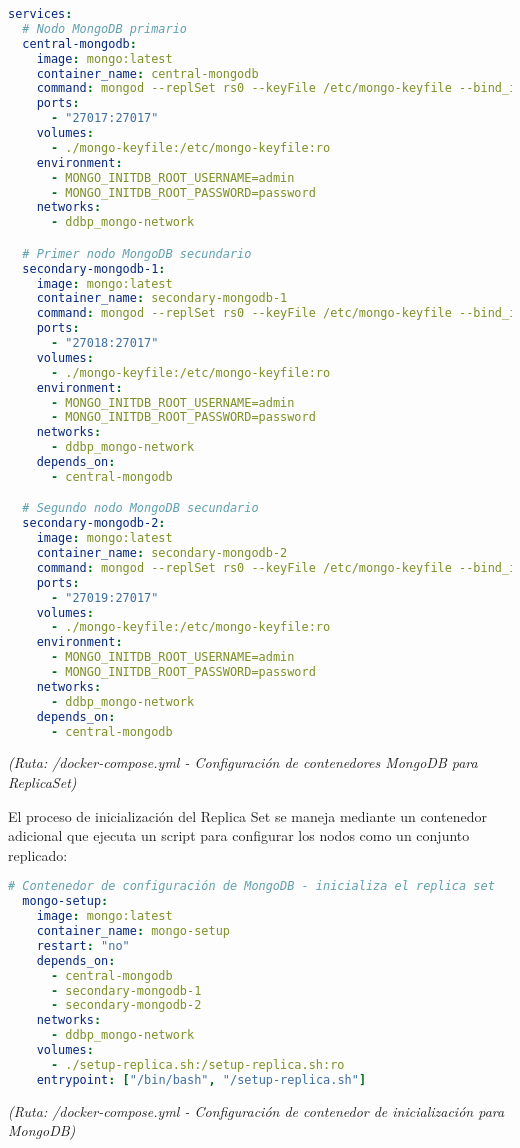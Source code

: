 \documentclass[12pt,letterpaper]{article}
\begin{document}
\begin{lstlisting}[language=yaml]
services:
  # Nodo MongoDB primario
  central-mongodb:
    image: mongo:latest
    container_name: central-mongodb
    command: mongod --replSet rs0 --keyFile /etc/mongo-keyfile --bind_ip_all --auth --port 27017
    ports:
      - "27017:27017"
    volumes:
      - ./mongo-keyfile:/etc/mongo-keyfile:ro
    environment:
      - MONGO_INITDB_ROOT_USERNAME=admin
      - MONGO_INITDB_ROOT_PASSWORD=password
    networks:
      - ddbp_mongo-network

  # Primer nodo MongoDB secundario
  secondary-mongodb-1:
    image: mongo:latest
    container_name: secondary-mongodb-1
    command: mongod --replSet rs0 --keyFile /etc/mongo-keyfile --bind_ip_all --auth --port 27017
    ports:
      - "27018:27017"
    volumes:
      - ./mongo-keyfile:/etc/mongo-keyfile:ro
    environment:
      - MONGO_INITDB_ROOT_USERNAME=admin
      - MONGO_INITDB_ROOT_PASSWORD=password
    networks:
      - ddbp_mongo-network
    depends_on:
      - central-mongodb

  # Segundo nodo MongoDB secundario
  secondary-mongodb-2:
    image: mongo:latest
    container_name: secondary-mongodb-2
    command: mongod --replSet rs0 --keyFile /etc/mongo-keyfile --bind_ip_all --auth --port 27017
    ports:
      - "27019:27017"
    volumes:
      - ./mongo-keyfile:/etc/mongo-keyfile:ro
    environment:
      - MONGO_INITDB_ROOT_USERNAME=admin
      - MONGO_INITDB_ROOT_PASSWORD=password
    networks:
      - ddbp_mongo-network
    depends_on:
      - central-mongodb
\end{lstlisting}
\textit{(Ruta: /docker-compose.yml - Configuración de contenedores MongoDB para ReplicaSet)}

El proceso de inicialización del Replica Set se maneja mediante un contenedor adicional que ejecuta un script para configurar los nodos como un conjunto replicado:

\begin{lstlisting}[language=yaml]
  # Contenedor de configuración de MongoDB - inicializa el replica set
  mongo-setup:
    image: mongo:latest
    container_name: mongo-setup
    restart: "no"
    depends_on:
      - central-mongodb
      - secondary-mongodb-1
      - secondary-mongodb-2
    networks:
      - ddbp_mongo-network
    volumes:
      - ./setup-replica.sh:/setup-replica.sh:ro
    entrypoint: ["/bin/bash", "/setup-replica.sh"]
\end{lstlisting}
\textit{(Ruta: /docker-compose.yml - Configuración de contenedor de inicialización para MongoDB)}
\end{document}
